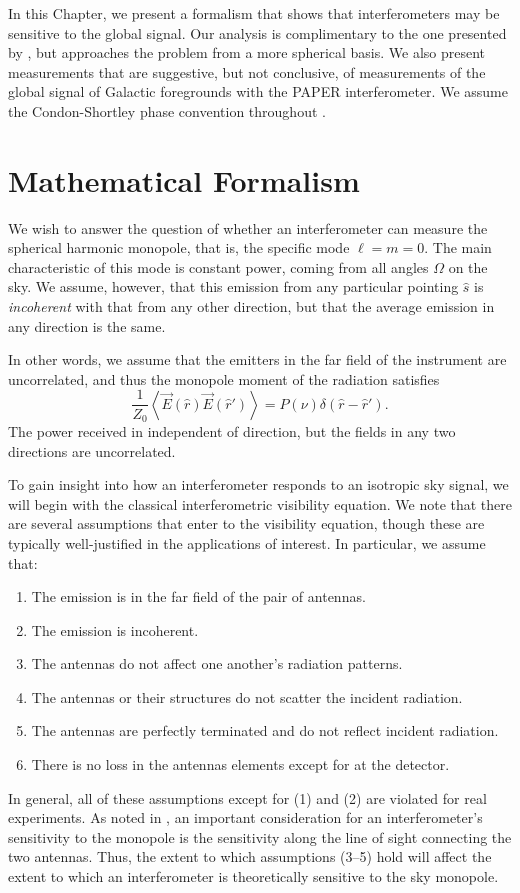 In this Chapter, we present a formalism that shows that interferometers may be sensitive to the global signal. Our analysis is complimentary to the one presented by \cite{Presley.15}, but approaches the problem from a more spherical basis. We also present measurements that are suggestive, but not conclusive, of measurements of the global signal of Galactic foregrounds with the PAPER interferometer. We assume the Condon-Shortley phase convention throughout \citep{Condon.51}.

\section{Mathematical Formalism}
\label{sec:global_signal_math}
We wish to answer the question of whether an interferometer can measure the
spherical harmonic monopole, that is, the specific mode $\ell = m =
0$. The main characteristic of this mode is constant power, coming from all angles
$\Omega$ on the sky. We assume, however, that this emission from any particular
pointing $\hat{s}$ is \textit{incoherent} with that from any other direction,
but that the average emission in any direction is the same. 

In other words, we
assume that the emitters in the far field of the instrument are uncorrelated,
and thus the monopole moment of the radiation satisfies
\begin{equation}
\frac{1}{Z_0} \left\langle \vec{E}(\hat{r})\vec{E}(\hat{r}') \right\rangle = P(\nu) \delta(\hat{r} - \hat{r}').
\end{equation}
The power received in independent of direction, but the fields in any two
directions are uncorrelated.

To gain insight into how an interferometer responds to an isotropic sky
signal, we will begin with the classical interferometric visibility equation. We note that
there are several assumptions that enter to the visibility equation, though
these are typically well-justified in the applications of interest. In
particular, we assume that:
\begin{enumerate}
\item The emission is in the far field of the pair of antennas.
\item The emission is incoherent.
\item The antennas do not affect one another's radiation patterns.
\item The antennas or their structures do not scatter the incident radiation.
\item The antennas are perfectly terminated and do not reflect incident radiation.
\item There is no loss in the antennas elements except for at the detector.
\end{enumerate}
In general, all of these assumptions except for (1) and (2) are violated for
real experiments. As noted in \cite{Venumadhav.16}, an important
consideration for an interferometer's sensitivity to the monopole is the
sensitivity along the line of sight connecting the two antennas. Thus, the
extent to which assumptions (3--5) hold will affect the extent to which an
interferometer is theoretically sensitive to the sky monopole.

